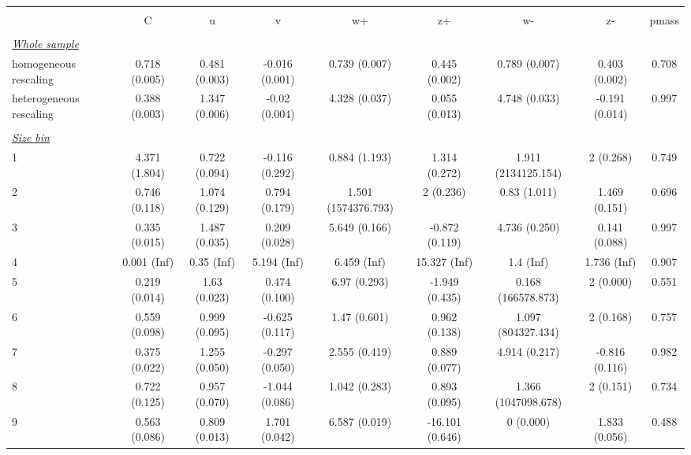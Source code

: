 
\begin{tabular}{@{\extracolsep{5pt}} l cccccccc} 
\\[-1.8ex]\hline 
\hline \\[-1.8ex] 
  & C & u & v & w+ & z+ & w- & z- & pmass \\ 
\hline \\[-1.8ex] 
\underline{{\it Whole sample}} &   &   &   &   &   &   &   &  \\ 
homogeneous rescaling & 0.718 (0.005) & 0.481 (0.003) & -0.016 (0.001) & 0.739 (0.007) & 0.445 (0.002) & 0.789 (0.007) & 0.403 (0.002) & 0.708 \\ 
heterogeneous rescaling & 0.388 (0.003) & 1.347 (0.006) & -0.02 (0.004) & 4.328 (0.037) & 0.055 (0.013) & 4.748 (0.033) & -0.191 (0.014) & 0.997 \\ 
 &   &   &   &   &   &   &   &  \\ 
\underline{{\it Size bin}} &   &   &   &   &   &   &   &  \\ 
1 & 4.371 (1.804) & 0.722 (0.094) & -0.116 (0.292) & 0.884 (1.193) & 1.314 (0.272) & 1.911 (2134125.154) & 2 (0.268) & 0.749 \\ 
2 & 0.746 (0.118) & 1.074 (0.129) & 0.794 (0.179) & 1.501 (1574376.793) & 2 (0.236) & 0.83 (1.011) & 1.469 (0.151) & 0.696 \\ 
3 & 0.335 (0.015) & 1.487 (0.035) & 0.209 (0.028) & 5.649 (0.166) & -0.872 (0.119) & 4.736 (0.250) & 0.141 (0.088) & 0.997 \\ 
4 & 0.001 (Inf) & 0.35 (Inf) & 5.194 (Inf) & 6.459 (Inf) & 15.327 (Inf) & 1.4 (Inf) & 1.736 (Inf) & 0.907 \\ 
5 & 0.219 (0.014) & 1.63 (0.023) & 0.474 (0.100) & 6.97 (0.293) & -1.949 (0.435) & 0.168 (166578.873) & 2 (0.000) & 0.551 \\ 
6 & 0.559 (0.098) & 0.999 (0.095) & -0.625 (0.117) & 1.47 (0.601) & 0.962 (0.138) & 1.097 (804327.434) & 2 (0.168) & 0.757 \\ 
7 & 0.375 (0.022) & 1.255 (0.050) & -0.297 (0.050) & 2.555 (0.419) & 0.889 (0.077) & 4.914 (0.217) & -0.816 (0.116) & 0.982 \\ 
8 & 0.722 (0.125) & 0.957 (0.070) & -1.044 (0.086) & 1.042 (0.283) & 0.893 (0.095) & 1.366 (1047098.678) & 2 (0.151) & 0.734 \\ 
9 & 0.563 (0.086) & 0.809 (0.013) & 1.701 (0.042) & 6.587 (0.019) & -16.101 (0.646) & 0 (0.000) & 1.833 (0.056) & 0.488 \\ 

\end{tabular}

